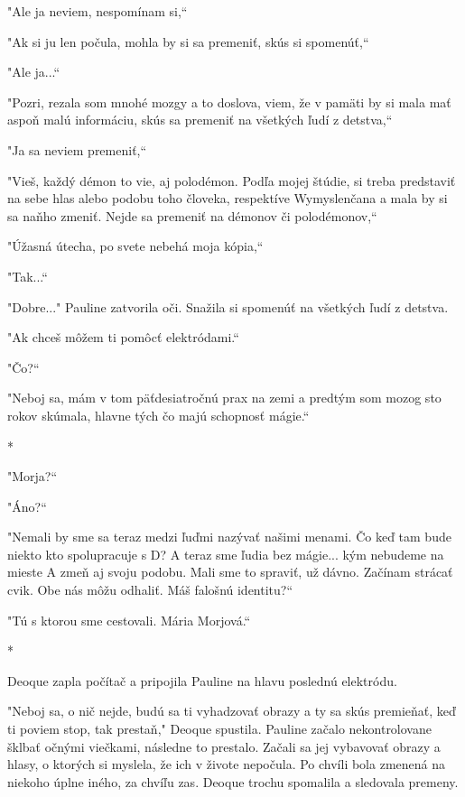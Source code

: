 \documentclass{book}
\begin{document}
"$ $Ale ja neviem, nespomínam si,“

"$ $Ak si ju len počula, mohla by si sa premeniť, skús si spomenúť,“

"$ $Ale ja...“

"Pozri, rezala som mnohé mozgy a to doslova, viem, že v pamäti by si mala mať aspoň malú informáciu, skús sa premeniť na všetkých ľudí z detstva,“

"Ja sa neviem premeniť,“

"Vieš, každý démon to vie, aj polodémon. Podľa mojej štúdie, si treba predstaviť na sebe hlas alebo podobu toho človeka, respektíve Wymyslenčana a mala by si sa naňho zmeniť. Nejde sa premeniť na démonov či polodémonov,“

"Úžasná útecha, po svete nebehá moja kópia,“

"Tak...“

"Dobre..."$ $ Pauline zatvorila oči. Snažila si spomenúť na všetkých ľudí z detstva. 

"$ $Ak chceš môžem ti pomôcť elektródami.“

"Čo?“

"Neboj sa, mám v tom päťdesiatročnú prax na zemi a predtým som mozog sto rokov skúmala, hlavne tých čo majú schopnosť mágie.“

\begin{center}
*
\end{center}

"Morja?“

"Áno?“

"Nemali by sme sa teraz medzi ľuďmi nazývať našimi menami. Čo keď tam bude niekto kto spolupracuje s D? A teraz sme ľudia bez mágie... kým nebudeme na mieste A zmeň aj svoju podobu. Mali sme to spraviť, už dávno. Začínam strácať cvik. Obe nás môžu odhaliť. Máš falošnú identitu?“

"Tú s ktorou sme cestovali. Mária Morjová.“

\begin{center}
*
\end{center}

Deoque zapla počítač a pripojila Pauline na hlavu poslednú elektródu.

"Neboj sa, o nič nejde, budú sa ti vyhadzovať obrazy a ty sa skús premieňať, keď ti poviem stop, tak prestaň,"$ $ Deoque spustila. Pauline začalo nekontrolovane šklbať očnými viečkami, následne to prestalo. Začali sa jej vybavovať obrazy a hlasy, o ktorých si myslela, že ich v živote nepočula. Po chvíli bola zmenená na niekoho úplne iného, za chvíľu zas. Deoque trochu spomalila a sledovala premeny.
\end{document}
